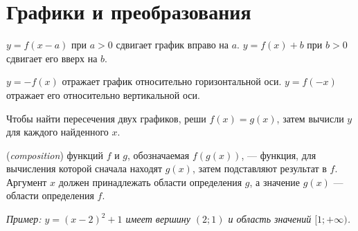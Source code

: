 \section{Графики и преобразования}
\(y = f (x - a)\) при \(a > 0\) сдвигает график вправо на \(a\). \(y = f (x) + b\) при \(b > 0\) сдвигает его вверх на \(b\).\par
\(y = - f (x)\) отражает график относительно горизонтальной оси. \(y = f (- x)\) отражает его относительно вертикальной оси.\par
Чтобы найти пересечения двух графиков, реши \(f (x) = g (x)\), затем вычисли \(y\) для каждого найденного \(x\).\par
\begin{definition} (\emph{composition}) функций \(f\) и \(g\), обозначаемая \(f(g(x))\), — функция, для вычисления которой сначала находят \(g(x)\), затем подставляют результат в \(f\). Аргумент \(x\) должен принадлежать области определения \(g\), а значение \(g(x)\) — области определения \(f\).\end{definition}
{\small\textit{Пример: \(y = (x - 2)^{2} + 1\) имеет вершину \((2;\allowbreak 1)\) и область значений \([1;\allowbreak + \infty )\).}}\par

